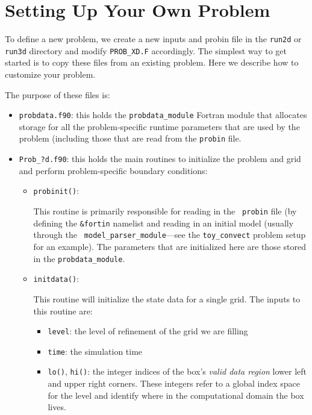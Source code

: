 \section{Setting Up Your Own Problem}

To define a new problem, we create a new inputs and probin file in 
the {\tt run2d} or {\tt run3d} directory and modify
{\tt PROB\_XD.F} accordingly. The
simplest way to get started is to copy these files from an existing
problem.  Here we describe how to customize your problem.

The purpose of these files is:
\begin{itemize}
\item {\tt probdata.f90}: this holds the {\tt probdata\_module} Fortran module
  that allocates storage for all the problem-specific runtime parameters that
  are used by the problem (including those that are read from the {\tt probin}
  file.

\item {\tt Prob\_?d.f90}: this holds the main routines to
  initialize the problem and grid and perform problem-specific boundary
  conditions:

  \begin{itemize}
  \item {\tt probinit()}:

    This routine is primarily responsible for reading in the {\tt
      probin} file (by defining the {\tt \&fortin} namelist and
    reading in an initial model (usually through the {\tt
      model\_parser\_module}---see the {\tt toy\_convect} problem
    setup for an example).  The parameters that are initialized
    here are those stored in the {\tt probdata\_module}.

  \item {\tt initdata()}:

    This routine will initialize the state data for a single grid.
    The inputs to this routine are:
    \begin{itemize}
    \item {\tt level}: the level of refinement of the grid we are filling

    \item {\tt time}: the simulation time

    \item {\tt lo()}, {\tt hi()}: the integer indices of the box's {\em
      valid data region} lower left and upper right corners.  These
      integers refer to a global index space for the level and
      identify where in the computational domain the box lives.


\end{itemize}
\end{itemize}
\end{itemize}
